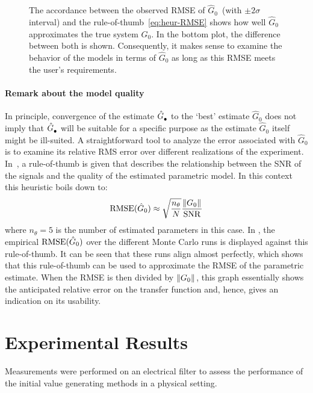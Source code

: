 \begin{figure}
  \centering
  \setlength{\figurewidth}{0.66\columnwidth}
  \setlength{\figureheight}{0.68\figurewidth}
  
 \caption[Simulated model \gls{RMSE} compared to rule-of-thumb.]{The accordance between the observed \gls{RMSE} of $\hat{G}_0$~(with $\pm2\sigma$ interval) and the rule-of-thumb~\eqref{eq:heur-RMSE} shows how well $\hat{G}_0$ approximates the true system $G_0$.
 In the bottom plot, the difference between both is shown.
 Consequently, it makes sense to examine the behavior of the models in terms of $\hat{G}_0$ as long as this RMSE meets the user's requirements.}
  \label{fig:RMSE}
\end{figure}

\paragraph*{Remark about the model quality}
In principle, convergence of the estimate $\hat{G}_{\mathrm{\bullet}}^{\mathrm{}}$ to the `best' estimate $\hat{G}_{0}$ does not imply that $\hat{G}_{\mathrm{\bullet}}^{\mathrm{}}$ will be suitable for a specific purpose as the estimate $\hat{G}_{0}$ itself might be ill-suited.
A straightforward tool to analyze the error associated with $\hat{G}_0$ is to examine its relative RMS error over different realizations of the experiment.
In~\citep{Ljung1999}, a rule-of-thumb is given that describes the relationship between the SNR of the signals and the quality of the estimated parametric model.
In this context this heuristic boils down to: 
\begin{equation}
    \mathrm{RMSE}(\hat{G}_{0}) \approx \sqrt{\frac{n_\theta}{N}} \frac{\left\| G_0 \right\|_{}}{\mathrm{SNR}} 
    \label{eq:heur-RMSE}
\end{equation}
where $n_{\theta}=5$ is the number of estimated parameters in this case.
In , the empirical $\mathrm{RMSE}(\hat{G}_{0})$ over the different Monte Carlo runs is displayed against this rule-of-thumb.
It can be seen that these runs align almost perfectly, which shows that this rule-of-thumb can be used to approximate the RMSE of the parametric estimate.
When the RMSE is then divided by $\left\| G_0 \right\|_{}$, this graph essentially shows the anticipated relative error on the transfer function and, hence, gives an indication on its usability.

\section{Experimental Results}
\label{se:ExpMeas}
Measurements were performed on an electrical filter to assess the performance of the initial value generating methods in a physical setting.

